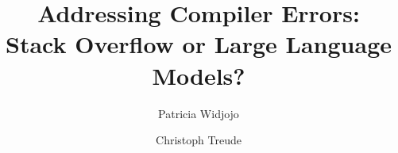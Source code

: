 \documentclass[preprint,12pt]{elsarticle}
\begin{document}
\sloppy

\begin{frontmatter}



\title{Addressing Compiler Errors:\\Stack Overflow or Large Language Models?}


\author[inst1]{Patricia Widjojo}
\author[inst1]{Christoph Treude}




\end{frontmatter}
\end{document}
